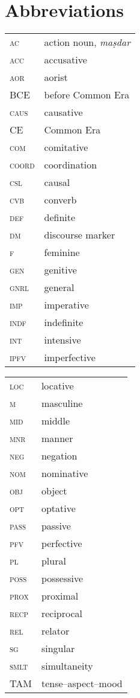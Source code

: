 \documentclass[output=paper]{langsci/langscibook}
\begin{document}
\section*{Abbreviations}
\begin{tabularx}{.5\textwidth}{@{}lQ@{}}
\textsc{ac} & action noun, \textit{maṣdar} \\
\textsc{acc} &{{accusative} }\\
\textsc{aor} & aorist \\
BCE & before Common Era \\
\textsc{caus} & {{causative} } \\
CE & Common Era \\
\textsc{com} & {{comitative} }\\
\textsc{coord} & {{coordination} }\\
\textsc{csl} & {{causal} }\\
\textsc{cvb} & {{converb} }\\
\textsc{def} & {{definite} }\\
\textsc{dm} & {{discourse marker}} \\
\textsc{f} & {{feminine} }\\
\textsc{gen} & genitive \\
\textsc{gnrl} & {{general} }\\
\textsc{imp} & {{imperative} }\\
\textsc{indf} & {{indefinite} }\\
\textsc{int} & {{intensive} }\\
\textsc{ipfv} & {{imperfective} }\\
\end{tabularx}%
\begin{tabularx}{.5\textwidth}{@{}lQ@{}}
\textsc{loc} & {{locative} }\\
\textsc{m} & {{masculine} }\\
\textsc{mid} & {{middle}}\\
\textsc{mnr} & {{manner} }\\
\textsc{neg} & {{negation} }\\
\textsc{nom} & {{nominative} }\\
\textsc{obj} & {{object} }\\
\textsc{opt} & {{optative} }\\
\textsc{pass} & {{passive} }\\
\textsc{pfv} & {{perfective} }\\
\textsc{pl} & plural \\
\textsc{poss} & {{possessive} }\\
\textsc{prox} & {{proximal} }\\
\textsc{recp} & {{reciprocal}}\\
\textsc{rel} & {{relator} }\\
\textsc{sg} & {{singular} } \\
\textsc{smlt} & {{simultaneity}} \\
TAM & {{tense--aspect--mood}}
\end{tabularx}%


\sloppy
\printbibliography[heading=subbibliography,notkeyword=this]
\end{document}

